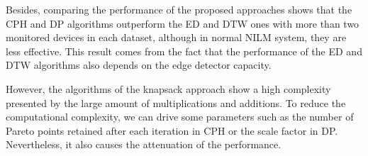 Besides, comparing the performance of the proposed approaches shows that the CPH and DP algorithms outperform the ED and DTW ones with more than two monitored devices in each dataset, although in normal NILM system, they are less effective. This result comes from the fact that the performance of the ED and DTW algorithms also depends on the edge detector capacity.

However, the algorithms of the knapsack approach show a high complexity presented by the large amount of multiplications and additions. To reduce the computational complexity, we can drive some parameters such as the number of Pareto points retained after each iteration in CPH or the scale factor in DP. Nevertheless, it also causes the attenuation of the performance. 